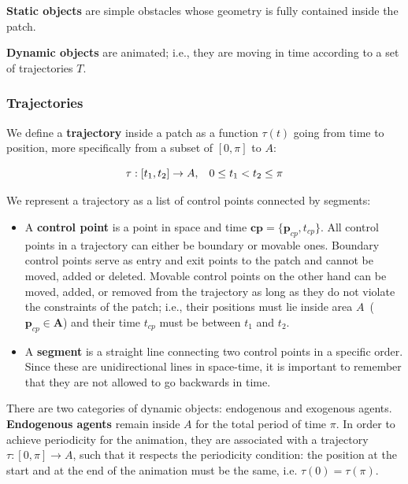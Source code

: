 \textbf{Static objects} are simple obstacles whose geometry is fully contained inside the patch.

\textbf{Dynamic objects} are animated; i.e., they are moving in time according to a set of trajectories $T$.


\subsubsection{Trajectories}

We define a {\bf trajectory} inside a patch as a function $\tau(t)$ going from time to position, more specifically from a subset of $[ 0,\pi ]$ to $A$:

\begin{equation}
	\tau:[t_1,t_2]\rightarrow A, \hspace{0.3cm} 0 \leq t_1 < t_2 \leq \pi
	\label{eqn:trajectory}
\end{equation}

We represent a trajectory as a list of control points connected by segments:

\begin{itemize}
  \item A {\bf control point} is a point in space and time $\mathbf{cp} = \{\mathbf{p}_{cp}, t_{cp}\}$.
All control points in a trajectory can either be boundary or movable ones.
Boundary control points serve as entry and exit points to the patch and cannot be moved, added or deleted.
Movable control points on the other hand can be moved, added, or removed from the trajectory as long as they do not violate the constraints of the patch; i.e., their positions must lie inside area $A$~($\mathbf{p}_{cp} \in \mathbf{A}$) and their time $t_{cp}$ must be between $t_1$ and $t_2$.
 \item A {\bf segment} is a straight line connecting two control points in a specific order. Since these are unidirectional lines in space-time, it is important to remember that they are not allowed to go backwards in time.  
\end{itemize}


There are two categories of dynamic objects: endogenous and exogenous agents.
{\bf Endogenous agents} remain inside $A$ for the total period of time $\pi$.
In order to achieve periodicity for the animation, they are associated with a trajectory $\tau : [0,\pi] \rightarrow A$, such that it respects the periodicity condition: the position at the start and at the end of the animation must be the same, i.e. \mbox{$\tau (0) = \tau (\pi)$}.

